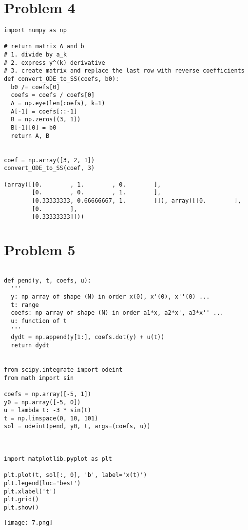 \documentclass[a4paper,11pt]{article}
\theoremstyle{mytheor}
\begin{document}
\section*{Problem 4}

\begin{lstlisting}[label={list:first}]
import numpy as np

# return matrix A and b
# 1. divide by a_k 
# 2. express y^(k) derivative 
# 3. create matrix and replace the last row with reverse coefficients
def convert_ODE_to_SS(coefs, b0):
  b0 /= coefs[0]
  coefs = coefs / coefs[0]
  A = np.eye(len(coefs), k=1)
  A[-1] = coefs[::-1]
  B = np.zeros((3, 1))
  B[-1][0] = b0
  return A, B
  
  
coef = np.array([3, 2, 1])
convert_ODE_to_SS(coef, 3)

(array([[0.        , 1.        , 0.        ],
        [0.        , 0.        , 1.        ],
        [0.33333333, 0.66666667, 1.        ]]), array([[0.        ],
        [0.        ],
        [0.33333333]]))
\end{lstlisting}


\section*{Problem 5}

\begin{lstlisting}[label={list:second}]

def pend(y, t, coefs, u):
  '''
  y: np array of shape (N) in order x(0), x'(0), x''(0) ...
  t: range
  coefs: np array of shape (N) in order a1*x, a2*x', a3*x'' ...
  u: function of t
  '''
  dydt = np.append(y[1:], coefs.dot(y) + u(t)) 
  return dydt


from scipy.integrate import odeint
from math import sin

coefs = np.array([-5, 1])
y0 = np.array([-5, 0])
u = lambda t: -3 * sin(t)
t = np.linspace(0, 10, 101)
sol = odeint(pend, y0, t, args=(coefs, u))



import matplotlib.pyplot as plt

plt.plot(t, sol[:, 0], 'b', label='x(t)')
plt.legend(loc='best')
plt.xlabel('t')
plt.grid()
plt.show()

\end{lstlisting}

\texttt{[image: 7.png]}
\end{document}
